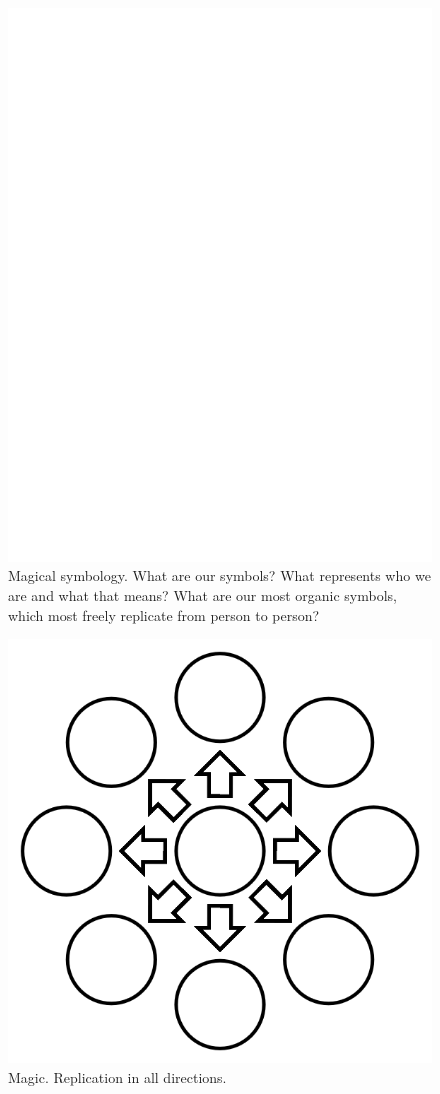 \documentclass{report}
\begin{document}
\begin{figure}
	\centering
	\includegraphics[width=5in]{imageserver/uploadimages/image3.png}
	\caption{Magical symbology. What are our symbols? What represents who we are and what that means?  What are our most organic symbols, which most freely replicate from person to person?}
\end{figure}


\begin{figure}
	\centering
	\includegraphics[width=5in]{imageserver/uploadimages/image12.png}
	\caption{Magic.  Replication in all directions.}
\end{figure}
\end{document}
